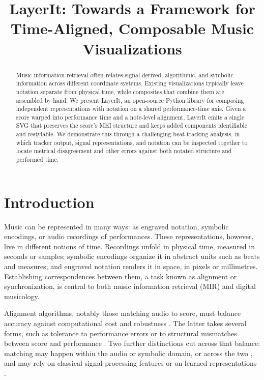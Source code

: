 \documentclass{article}
\title{LayerIt: Towards a Framework for Time-Aligned, Composable Music Visualizations}
\begin{document}
%
\maketitle
%
\begin{abstract}
Music information retrieval often relates signal-derived, algorithmic, and symbolic information across different coordinate systems. Existing visualizations typically leave notation separate from physical time, while composites that combine them are assembled by hand. We present LayerIt, an open-source Python library for composing independent representations with notation on a shared performance-time axis. Given a score warped into performance time and a note-level alignment, LayerIt emits a single SVG that preserves the score’s MEI structure and keeps added components identifiable and restylable. We demonstrate this through a challenging beat-tracking analysis, in which tracker output, signal representations, and notation can be inspected together to locate metrical disagreement and other errors against both notated structure and performed time.
\end{abstract}
%
\section{Introduction}\label{sec:introduction}

Music can be represented in many ways: as engraved notation, symbolic encodings, or audio recordings of performances. These representations, however, live in different notions of time. Recordings unfold in physical time, measured in seconds or samples; symbolic encodings organize it in abstract units such as beats and measures; and engraved notation renders it in space, in pixels or millimetres. Establishing correspondences between them, a task known as alignment or synchronization, is central to both music information retrieval (MIR) and digital musicology.

Alignment algorithms, notably those matching audio to score, must balance accuracy against computational cost and robustness \cite{muller2021SyncToolboxPython}. The latter takes several forms, such as tolerance to performance errors \cite{nakamura2017PerformanceErrorDetection} or to structural mismatches between score and performance \cite{fremerey2010HandlingRepeatsJumps}. Two further distinctions cut across that balance: matching may happen within the audio or symbolic domain, or across the two \cite{mueller2019CrossModalMusicRetrieval}, and may rely on classical signal-processing features or on learned representations \cite{zeitler2025RobustAccurateAudio}.
\end{document}
